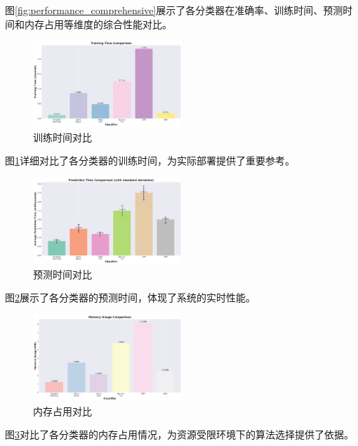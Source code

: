 \documentclass[sigconf,nonacm]{acmart}
\begin{document}
图\ref{fig:performance_comprehensive}展示了各分类器在准确率、训练时间、预测时间和内存占用等维度的综合性能对比。

\begin{figure}[htbp]
\centering
\includegraphics[width=0.5\textwidth]{performance/training_time.png}
\caption{训练时间对比}
\label{fig:training_time}
\end{figure}

图\ref{fig:training_time}详细对比了各分类器的训练时间，为实际部署提供了重要参考。

\begin{figure}[htbp]
\centering
\includegraphics[width=0.5\textwidth]{performance/prediction_time.png}
\caption{预测时间对比}
\label{fig:prediction_time}
\end{figure}

图\ref{fig:prediction_time}展示了各分类器的预测时间，体现了系统的实时性能。

\begin{figure}[htbp]
\centering
\includegraphics[width=0.5\textwidth]{performance/memory_usage.png}
\caption{内存占用对比}
\label{fig:memory_usage}
\end{figure}

图\ref{fig:memory_usage}对比了各分类器的内存占用情况，为资源受限环境下的算法选择提供了依据。
\end{document}
